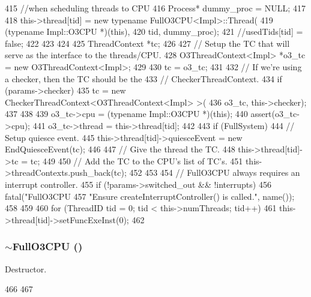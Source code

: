 \begin{DoxyCode}
{{{{415                 //when scheduling threads to CPU
416                 Process* dummy_proc = NULL;
417 
418                 this->thread[tid] = new typename FullO3CPU<Impl>::Thread(
419                         (typename Impl::O3CPU *)(this),
420                         tid, dummy_proc);
421                 //usedTids[tid] = false;
422             }
423         }
424 
425         ThreadContext *tc;
426 
427         // Setup the TC that will serve as the interface to the threads/CPU.
428         O3ThreadContext<Impl> *o3_tc = new O3ThreadContext<Impl>;
429 
430         tc = o3_tc;
431 
432         // If we're using a checker, then the TC should be the
433         // CheckerThreadContext.
434         if (params->checker) {
435             tc = new CheckerThreadContext<O3ThreadContext<Impl> >(
436                 o3_tc, this->checker);
437         }
438 
439         o3_tc->cpu = (typename Impl::O3CPU *)(this);
440         assert(o3_tc->cpu);
441         o3_tc->thread = this->thread[tid];
442 
443         if (FullSystem) {
444             // Setup quiesce event.
445             this->thread[tid]->quiesceEvent = new EndQuiesceEvent(tc);
446         }
447         // Give the thread the TC.
448         this->thread[tid]->tc = tc;
449 
450         // Add the TC to the CPU's list of TC's.
451         this->threadContexts.push_back(tc);
452     }
453 
454     // FullO3CPU always requires an interrupt controller.
455     if (!params->switched_out && !interrupts) {
456         fatal("FullO3CPU %
457               "Ensure createInterruptController() is called.\n", name());
458     }
459 
460     for (ThreadID tid = 0; tid < this->numThreads; tid++)
461         this->thread[tid]->setFuncExeInst(0);
462 }
\end{DoxyCode}
\hypertarget{classFullO3CPU_a6788b6adc1e142f49c6776ba4c85d824}{
\subsubsection[{$\sim$FullO3CPU}]{\setlength{\rightskip}{0pt plus 5cm}$\sim${\bf FullO3CPU} ()}}
\label{classFullO3CPU_a6788b6adc1e142f49c6776ba4c85d824}
Destructor. 


\begin{DoxyCode}
466 {
467 }
\end{DoxyCode}


